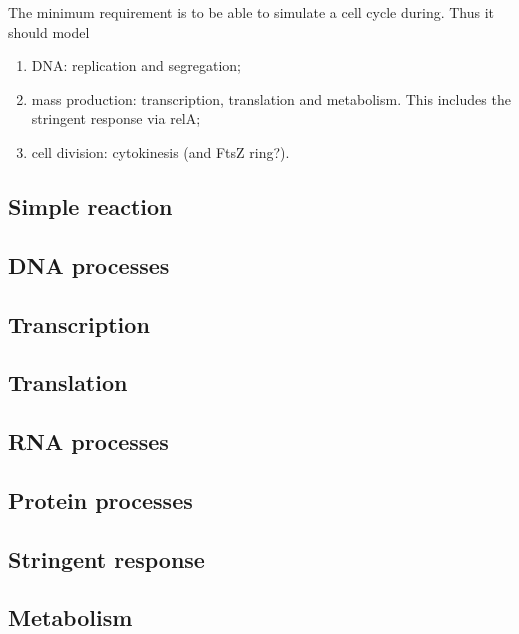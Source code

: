 The minimum requirement is to be able to simulate a cell cycle during. Thus it should model
\begin{enumerate}
  \item DNA: replication and segregation;
  \item mass production: transcription, translation and metabolism. This includes the stringent response via relA;
  \item cell division: cytokinesis (and FtsZ ring?).
\end{enumerate}



\subsection{Simple reaction}


\subsection{DNA processes}


\subsection{Transcription}


\subsection{Translation}


\subsection{RNA processes}


\subsection{Protein processes}


\subsection{Stringent response}


\subsection{Metabolism}


